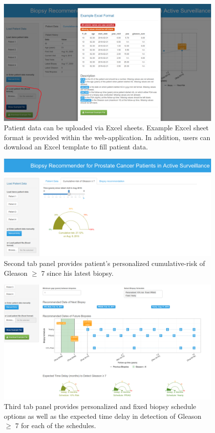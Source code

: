 \begin{figure}
\centerline{\includegraphics[width=\columnwidth]{images/app/excel_entry.png}}
\caption{Patient data can be uploaded via Excel sheets. Example Excel sheet format is provided within the web-application. In addition, users can download an Excel template to fill patient data.}
\label{fig:excel_entry}
\end{figure}

\begin{figure}
\centerline{\includegraphics[width=\columnwidth]{images/app/cum_risk.png}}
\caption{Second tab panel provides patient's personalized cumulative-risk of Gleason $\geq$ 7 since his latest biopsy.}
\label{fig:cum_risk}
\end{figure}

\begin{figure}
\centerline{\includegraphics[width=\columnwidth]{images/app/biopsy_recommendation.png}}
\caption{Third tab panel provides personalized and fixed biopsy schedule options as well as the expected time delay in detection of Gleason $\geq$ 7 for each of the schedules.}
\label{fig:biopsy_recommendation}
\end{figure}
